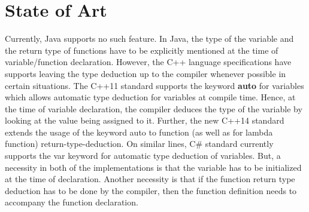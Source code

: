 \section{State of Art}
Currently, Java supports no such feature. In Java, the  type of the variable and the return type of functions have to be explicitly mentioned at the time of variable/function declaration. However, the C++ language specifications have supports leaving the type deduction up to the compiler whenever possible in certain situations. The C++11 standard supports the keyword \textbf{auto} for variables which allows automatic type deduction for variables at compile time. Hence, at the time of variable declaration, the compiler deduces the type of the variable by looking at the value being assigned to it. Further, the new C++14 standard extends the usage of the keyword auto to function (as well as for lambda function) return-type-deduction. On similar lines, C\# standard currently supports the var keyword for automatic type deduction of variables. But, a necessity in both of the implementations is that the variable has to be initialized at the time of declaration. Another necessity is that if the function return type deduction has to be done by the compiler, then the function definition needs to accompany the function declaration.